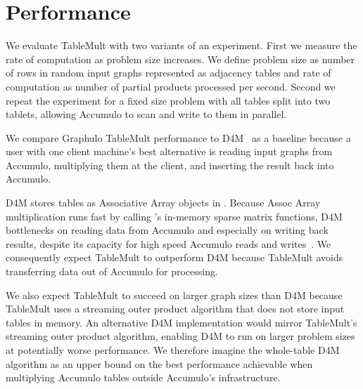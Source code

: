 
\section{Performance}
\label{sPerformance}

We evaluate TableMult with two variants of an experiment. 
First we measure the rate of computation as problem size increases.
We define problem size as number of rows in random input graphs 
represented as adjacency tables
and rate of computation as number of partial products processed per second.
Second we repeat the experiment for a fixed size problem with all tables split into two tablets,
allowing Accumulo to scan and write to them in parallel.



We compare Graphulo TableMult performance to D4M~\cite{kepner2012dynamic} as a baseline because 
a user with one client machine's best alternative is reading input graphs from Accumulo, 
multiplying them at the client, and inserting the result back into Accumulo.

D4M stores tables as Associative Array objects in \matlab{}.  
Because Assoc Array multiplication runs fast
by calling \matlab{}'s in-memory sparse matrix functions, 
D4M bottlenecks on reading data from Accumulo and especially on writing back results,
despite its capacity for high speed Accumulo reads and writes~\cite{kepner2014achieving}.
We consequently expect TableMult to outperform D4M 
because TableMult avoids transferring data out of Accumulo for processing. 

We also expect TableMult to succeed on larger graph sizes than D4M because TableMult
uses a streaming outer product algorithm that does not store input tables in memory.
An alternative D4M implementation would mirror TableMult's streaming outer product algorithm,
enabling D4M to run on larger problem sizes at potentially worse performance.
We therefore imagine the whole-table D4M algorithm as an upper bound on the best performance 
achievable when multiplying Accumulo tables outside Accumulo's infrastructure.

